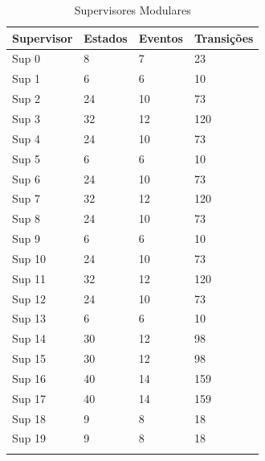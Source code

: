 \begin{table}[h!]%
\begin{center}
\begin{minipage}{0.5\textwidth}
\caption{Supervisores Modulares}
\label{tab:supervisor}
\begin{tabular}{@{}llll@{}}
  \toprule
  Supervisor & Estados & Eventos & Transições\\
  \midrule
  Sup 0 & 8 & 7 & 23\\
  Sup 1 & 6 & 6 & 10\\
  Sup 2 & 24 & 10 & 73\\
  Sup 3 & 32 & 12 & 120\\
  Sup 4 & 24 & 10 & 73\\
  Sup 5 & 6 & 6 & 10\\
  Sup 6 & 24 & 10 & 73\\
  Sup 7 & 32 & 12 & 120\\
  Sup 8 & 24 & 10 & 73\\
  Sup 9 & 6 & 6 & 10\\
  Sup 10 & 24 & 10 & 73\\
  Sup 11 & 32 & 12 & 120\\
  Sup 12 & 24 & 10 & 73\\
  Sup 13 & 6 & 6 & 10\\
  Sup 14 & 30 & 12 & 98\\
  Sup 15 & 30 & 12 & 98\\
  Sup 16 & 40 & 14 & 159\\
  Sup 17 & 40 & 14 & 159\\
  Sup 18 & 9 & 8 & 18\\
  Sup 19 & 9 & 8 & 18\\
  \botrule
\end{tabular}
\end{minipage}
\end{center}
\end{table}